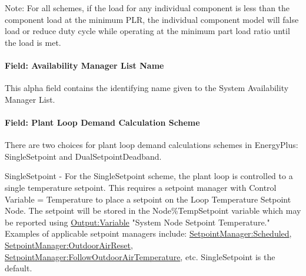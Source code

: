 Note: For all schemes, if the load for any individual component is less than the component load at the minimum PLR, the individual component model will false load or reduce duty cycle while operating at the minimum part load ratio until the load is met.

\paragraph{Field: Availability Manager List Name}\label{field-availability-manager-list-name-000}

This alpha field contains the identifying name given to the System Availability Manager List.

\paragraph{Field: Plant Loop Demand Calculation Scheme}\label{field-plant-loop-demand-calculation-scheme}
There are two choices for plant loop demand calculations schemes in EnergyPlus: SingleSetpoint and DualSetpointDeadband.

SingleSetpoint - For the SingleSetpoint scheme, the plant loop is controlled to a single temperature setpoint. This requires a setpoint manager with Control Variable = Temperature to place a setpoint on the Loop Temperature Setpoint Node. The setpoint will be stored in the Node\%TempSetpoint variable which may be reported using \hyperref[outputvariable]{Output:Variable} "System Node Setpoint Temperature." Examples of applicable setpoint managers include: \hyperref[setpointmanagerscheduled]{SetpointManager:Scheduled}, \hyperref[setpointmanageroutdoorairreset]{SetpointManager:OutdoorAirReset}, \hyperref[setpointmanagerfollowoutdoorairtemperature]{SetpointManager:FollowOutdoorAirTemperature}, etc. SingleSetpoint is the default.

